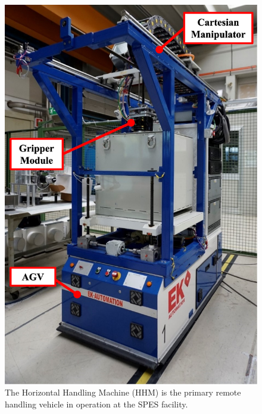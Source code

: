 \documentclass{ieeeojies}
\begin{document}
\begin{figure}[b!]
    \centering
    \includegraphics[width=0.8\columnwidth]{pictures/lilli01.eps}
    \caption{The Horizontal Handling Machine (HHM) is the primary remote handling vehicle in operation at the SPES facility.} 
    \label{fig:hhm}
\end{figure}
\end{document}

